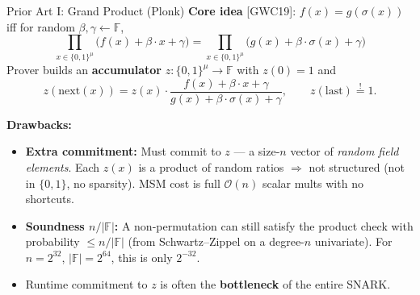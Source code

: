 \documentclass[aspectratio=169,10pt]{beamer}
\newcommand{\F}{\mathbb{F}}
\newcommand{\B}{\{0,1\}}
\newcommand{\bigO}{\mathcal{O}}
\begin{document}
\begin{frame}{Prior Art I: Grand Product (Plonk)}
\textbf{Core idea} [GWC19]: $f(x) = g(\sigma(x))$ iff for random $\beta, \gamma \leftarrow \F$,
\[
  \prod_{x \in \B^\mu} \bigl(f(x) + \beta \cdot x + \gamma\bigr) = \prod_{x \in \B^\mu} \bigl(g(x) + \beta \cdot \sigma(x) + \gamma\bigr)
\]
Prover builds an \textbf{accumulator} $z : \B^\mu \to \F$ with $z(0) = 1$ and
\[
  z(\text{next}(x)) = z(x) \cdot \frac{f(x) + \beta \cdot x + \gamma}{g(x) + \beta \cdot \sigma(x) + \gamma}, \qquad z(\text{last}) \stackrel{!}{=} 1.
\]

\vspace{0.3em}
\textbf{Drawbacks:}
\begin{itemize}
  \item \textbf{Extra commitment:} Must commit to $z$ --- a size-$n$ vector of \emph{random field elements}. Each $z(x)$ is a product of random ratios $\Rightarrow$ not structured (not in $\{0,1\}$, no sparsity). MSM cost is full $\bigO(n)$ scalar mults with no shortcuts.
  \item \textbf{Soundness $n/|\F|$:} A non-permutation can still satisfy the product check with probability $\le n/|\F|$ (from Schwartz--Zippel on a degree-$n$ univariate). For $n = 2^{32}$, $|\F| = 2^{64}$, this is only $2^{-32}$.
  \item Runtime commitment to $z$ is often the \textbf{bottleneck} of the entire SNARK.
\end{itemize}
\end{frame}
\end{document}
